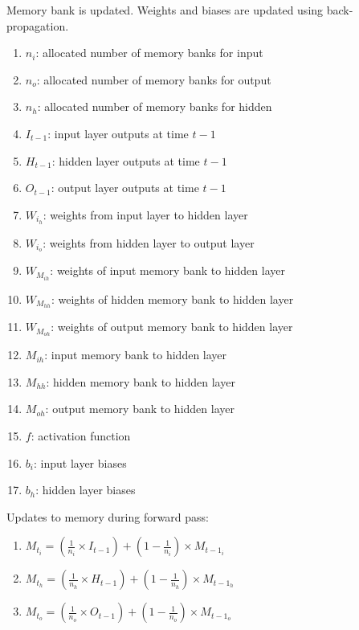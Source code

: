 \documentclass[conference]{IEEEtran}
\begin{document}
Memory bank is updated. Weights and biases are updated using back-propagation.

\begin{enumerate}
	\item $n_i$: allocated number of memory banks for input
	\item $n_o$: allocated number of memory banks for output
	\item $n_h$: allocated number of memory banks for hidden
	\item $I_{t-1}$: input layer outputs at time $t-1$
	\item $H_{t-1}$: hidden layer outputs at time $t-1$
	\item $O_{t-1}$: output layer outputs at time $t-1$
	\item $W_{i_h}$: weights from input layer to hidden layer
	\item $W_{i_o}$: weights from hidden layer to output layer
	\item $W_{M_{ih}}$: weights of input memory bank to hidden layer
	\item $W_{M_{hh}}$: weights of hidden memory bank to hidden layer
	\item $W_{M_{oh}}$: weights of output memory bank to hidden layer
	\item $M_{ih}$: input memory bank to hidden layer
	\item $M_{hh}$: hidden memory bank to hidden layer
	\item $M_{oh}$: output memory bank to hidden layer
	\item $f$: activation function
	\item $b_i$: input layer biases
	\item $b_h$: hidden layer biases
\end{enumerate}

Updates to memory during forward pass:

\begin{enumerate}[]
	\item $M_{t_{i}} = \left(\tfrac{1}{n_{i}} \times I_{t-1}\right) + \left(1 - \tfrac{1}{n_{i}}\right) \times M_{t-1_{i}}$
	
	\item $M_{t_{h}} = \left(\tfrac{1}{n_{h}} \times H_{t-1}\right) + \left(1 - \tfrac{1}{n_{h}}\right) \times M_{t-1_{h}}$
	
	\item $M_{t_{o}} = \left(\tfrac{1}{n_{o}} \times O_{t-1}\right) + \left(1 - \tfrac{1}{n_{o}}\right) \times M_{t-1_{o}}$
\end{enumerate}
\end{document}

